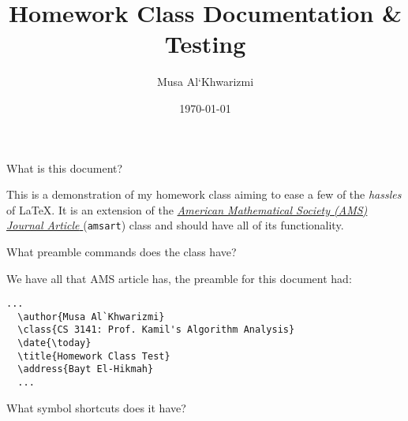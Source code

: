 \documentclass{homework}
\author{Musa Al`Khwarizmi}
\date{\today}
\title{\LaTeXe{} Homework Class Documentation \& Testing}
\renewcommand\tt[1]{\texttt{#1}}
\newcommand{\amslink}{%
  \href{https://ctan.org/pkg/amsart}{%
    \textit{American Mathematical Society (AMS) Journal Article} %
  }}
\begin{document}
 \maketitle

\question What is this document?

\begin{sol}
  This is a demonstration of my homework class aiming to ease a few of
  the \textit{hassles} of \LaTeX{}. It is an extension of the \amslink
  (\tt{amsart}) class and should have all of its functionality.
\end{sol}

\question What preamble commands does the class have?

\begin{sol}
  We have all that AMS article has, the preamble for this document had:
  \begin{lstlisting}[language={[LaTeX]TeX}]
  ...
  \author{Musa Al`Khwarizmi}
  \class{CS 3141: Prof. Kamil's Algorithm Analysis}
  \date{\today}
  \title{Homework Class Test}
  \address{Bayt El-Hikmah}
  ...
\end{lstlisting}
\end{sol}

\question What symbol shortcuts does it have?
\end{document}
